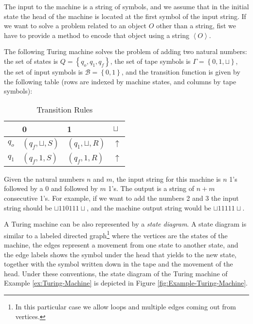 The input to the machine is a string of symbols, and we assume that in the initial state the head of the machine is located at the first symbol of the input string. If we want to solve a problem related to an object $O$ other than a string, fist we have to provide a method to encode that object using a string $\left\langle O \right\rangle$.

\begin{example}
\label{ex:Turing-Machine}
The following Turing machine solves the problem of adding two natural numbers: the set of states is $Q = \left\{q_{o}, q_{1}, q_{f}\right\}$, the set of tape symbols is $\Gamma = \left\{0, 1, \sqcup \right\}$, the set of input symbols is $\mathcal{B} = \left\{0, 1 \right\}$, and the transition function is given by the following table (rows are indexed by machine states, and columns by tape symbols):

\begin{table}[h]
\centering
\begin{tabular}{l l l l}
\toprule
 & 0 & 1 & $\sqcup$ \\
\midrule
$q_{o}$ & $\left(q_{f}, \sqcup, S\right)$ & $\left(q_{1}, \sqcup, R\right)$ & $\uparrow$ \\
$q_{1}$ & $\left(q_{f}, 1     , S\right)$ & $\left(q_{f}, 1     , R\right)$ & $\uparrow$ \\
\bottomrule
\end{tabular}
\caption{Transition Rules}
\end{table}

Given the natural numbers $n$ and $m$, the input string for this machine is $n$ 1's followed by a $0$ and followed by $m$ 1's. The output is a string of $n+m$ consecutive 1's. For example, if we want to add the numbers 2 and 3 the input string should be $\sqcup 1 1 0 1 1 1 \sqcup$, and the machine output string would be $\sqcup 1 1 1 1 1 \sqcup$.
\end{example}

A Turing machine can be also represented by a \emph{state diagram}. A state diagram is similar to a labeled directed graph\footnote{In this particular case we allow loops and multiple edges coming out from vertices.} where the vertices are the states of the machine, the edges represent a movement from one state to another state, and the edge labels shows the symbol under the head that yields to the new state, together with the symbol written down in the tape and the movement of the head. Under these conventions, the state diagram of the Turing machine of Example \ref{ex:Turing-Machine} is depicted in Figure \ref{fig:Example-Turing-Machine}.


